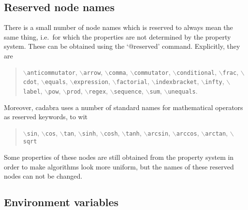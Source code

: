 \documentclass[11pt]{article}
\newcommand{\cdb}{{cadabra}\xspace}
\newenvironment{reserved}{\par\noindent\description}{\enddescription}
\newcommand{\texcommand}[1]{{\tt $\backslash$#1}}
\numberwithin{equation}{section}
\begin{document}
\subsection{Reserved node names}
\label{s:reserved_names}

There is a small number of node names which is reserved to always mean
the same thing, i.e.~for which the properties are not determined by
the property system. These can be obtained using the `@reserved'
command. Explicitly, they are
%
%
\begin{quote}
\texcommand{anticommutator},
\texcommand{arrow},
\texcommand{comma}, 
\texcommand{commutator}, 
\texcommand{conditional},
\texcommand{frac}, 
\texcommand{cdot},
\texcommand{equals}, 
\texcommand{expression},
\texcommand{factorial},
\texcommand{indexbracket}, 
\texcommand{infty}, 
\texcommand{label},
\texcommand{pow}, 
\texcommand{prod}, 
\texcommand{regex}, 
\texcommand{sequence},
\texcommand{sum},
\texcommand{unequals}.
\end{quote}
Moreover, \cdb uses a number of standard names for mathematical
operators as reserved keywords, to wit
\begin{quote}
\texcommand{sin},
\texcommand{cos},
\texcommand{tan},
\texcommand{sinh},
\texcommand{cosh},
\texcommand{tanh},
\texcommand{arcsin},
\texcommand{arccos},
\texcommand{arctan},
\texcommand{sqrt}
\end{quote}
Some properties of these nodes are still obtained from the property
system in order to make algorithms look more uniform, but the names of
these reserved nodes can not be changed. 

\begin{reserved}



















\end{reserved}


\subsection{Environment variables}
\label{s:environment_variables}
\end{document}
